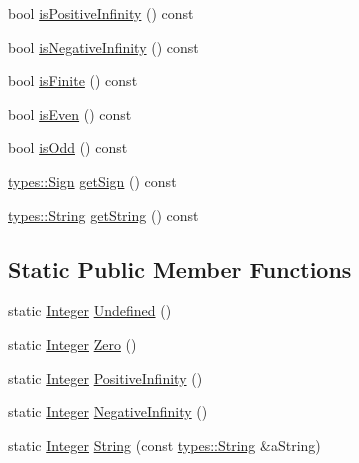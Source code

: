 \begin{DoxyCompactItemize}
\item 
bool \hyperlink{classlibrary_1_1core_1_1types_1_1Integer_a82713f4a7737cf59ad402bceb5f2017f}{is\+Positive\+Infinity} () const
\item 
bool \hyperlink{classlibrary_1_1core_1_1types_1_1Integer_ae7e2fcfb35272cf58b5e548a7702950c}{is\+Negative\+Infinity} () const
\item 
bool \hyperlink{classlibrary_1_1core_1_1types_1_1Integer_a892617aa8be82ac3c4e4dfb9129c7613}{is\+Finite} () const
\item 
bool \hyperlink{classlibrary_1_1core_1_1types_1_1Integer_a12f0f831be3e8a88c2e4ea250a9019e5}{is\+Even} () const
\item 
bool \hyperlink{classlibrary_1_1core_1_1types_1_1Integer_a4b403f5ac370a1f333c67fda7c54e1ed}{is\+Odd} () const
\item 
\hyperlink{namespacelibrary_1_1core_1_1types_a06d9eaa410d43a0fa3f383040618e87d}{types\+::\+Sign} \hyperlink{classlibrary_1_1core_1_1types_1_1Integer_abe567cca5d1e448329195df5d16d48e6}{get\+Sign} () const
\item 
\hyperlink{classlibrary_1_1core_1_1types_1_1String}{types\+::\+String} \hyperlink{classlibrary_1_1core_1_1types_1_1Integer_a157230adc28642b992041ae299973ddc}{get\+String} () const
\end{DoxyCompactItemize}
\subsection*{Static Public Member Functions}
\begin{DoxyCompactItemize}
\item 
static \hyperlink{classlibrary_1_1core_1_1types_1_1Integer}{Integer} \hyperlink{classlibrary_1_1core_1_1types_1_1Integer_a142c2df49031b787daf30673c73fcad7}{Undefined} ()
\item 
static \hyperlink{classlibrary_1_1core_1_1types_1_1Integer}{Integer} \hyperlink{classlibrary_1_1core_1_1types_1_1Integer_a908c9b717859421a99d6d8c269685211}{Zero} ()
\item 
static \hyperlink{classlibrary_1_1core_1_1types_1_1Integer}{Integer} \hyperlink{classlibrary_1_1core_1_1types_1_1Integer_a807320f164c841288eafff5f49470c00}{Positive\+Infinity} ()
\item 
static \hyperlink{classlibrary_1_1core_1_1types_1_1Integer}{Integer} \hyperlink{classlibrary_1_1core_1_1types_1_1Integer_aa8151c3b615012ec215d20da6de593bd}{Negative\+Infinity} ()
\item 
static \hyperlink{classlibrary_1_1core_1_1types_1_1Integer}{Integer} \hyperlink{classlibrary_1_1core_1_1types_1_1Integer_af4d25f6f706e8a4a6b2ec97b506e940a}{String} (const \hyperlink{classlibrary_1_1core_1_1types_1_1String}{types\+::\+String} \&a\+String)
\end{DoxyCompactItemize}
